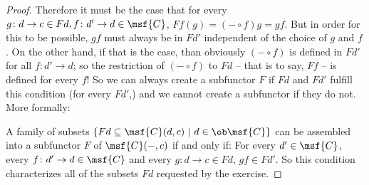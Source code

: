 \documentclass[main,tex]{subfiles}
\begin{document}
\begin{proof}
	Therefore it must be the case that for every \(g \colon d
	\to c \in Fd, f \colon d' \to d \in \msf{C}\), \(Ff(g) = (- \circ f)g =
	gf\). But in order for this to be possible, \(gf\) must always be in
	\(Fd'\) independent of the choice of \(g\) and \(f\). On the other
	hand, if
	that is the case, than obviously \((- \circ f)\) is defined in
	\(Fd'\) for all \(f \colon d' \to d\); so the restriction of \((- \circ
	f)\) to \(Fd\) -- that is to say, \(Ff\) -- is defined for every \(f\)!
	So we can always create a subfunctor \(F\) if \(Fd\) and \(Fd'\)
	fulfill this condition (for every \(Fd'\),) and we cannot create a
	subfunctor if they do not.  More formally:

	A family of subsets \(\{Fd \subseteq \msf{C}(d, c) \ | \ d \in
	\ob\msf{C}\}\) can be assembled into a subfunctor \(F\) of
	\(\msf{C}(-,c)\) if and only if: For every \(d' \in \msf{C}\), every
	\(f \colon d' \to d \in \msf{C}\) and every \(g \colon d \to c \in
	Fd\), \(gf \in Fd'\). So this condition characterizes all of the
	subsets \(Fd\) requested by the exercise.
\end{proof}
\end{document}
